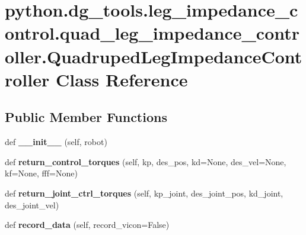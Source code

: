 \hypertarget{classpython_1_1dg__tools_1_1leg__impedance__control_1_1quad__leg__impedance__controller_1_1QuadrupedLegImpedanceController}{}\section{python.\+dg\+\_\+tools.\+leg\+\_\+impedance\+\_\+control.\+quad\+\_\+leg\+\_\+impedance\+\_\+controller.\+Quadruped\+Leg\+Impedance\+Controller Class Reference}
\label{classpython_1_1dg__tools_1_1leg__impedance__control_1_1quad__leg__impedance__controller_1_1QuadrupedLegImpedanceController}
\subsection*{Public Member Functions}
\begin{DoxyCompactItemize}
\item 
def {\bfseries \+\_\+\+\_\+init\+\_\+\+\_\+} (self, robot)\hypertarget{classpython_1_1dg__tools_1_1leg__impedance__control_1_1quad__leg__impedance__controller_1_1QuadrupedLegImpedanceController_afc8023b76557c43c7c78728e2c488a13}{}\label{classpython_1_1dg__tools_1_1leg__impedance__control_1_1quad__leg__impedance__controller_1_1QuadrupedLegImpedanceController_afc8023b76557c43c7c78728e2c488a13}

\item 
def {\bfseries return\+\_\+control\+\_\+torques} (self, kp, des\+\_\+pos, kd=None, des\+\_\+vel=None, kf=None, fff=None)\hypertarget{classpython_1_1dg__tools_1_1leg__impedance__control_1_1quad__leg__impedance__controller_1_1QuadrupedLegImpedanceController_ac088ea885c8fd492b7530ab324a6c13d}{}\label{classpython_1_1dg__tools_1_1leg__impedance__control_1_1quad__leg__impedance__controller_1_1QuadrupedLegImpedanceController_ac088ea885c8fd492b7530ab324a6c13d}

\item 
def {\bfseries return\+\_\+joint\+\_\+ctrl\+\_\+torques} (self, kp\+\_\+joint, des\+\_\+joint\+\_\+pos, kd\+\_\+joint, des\+\_\+joint\+\_\+vel)\hypertarget{classpython_1_1dg__tools_1_1leg__impedance__control_1_1quad__leg__impedance__controller_1_1QuadrupedLegImpedanceController_a3771f36bdc425fe25f9ea7be910be6cc}{}\label{classpython_1_1dg__tools_1_1leg__impedance__control_1_1quad__leg__impedance__controller_1_1QuadrupedLegImpedanceController_a3771f36bdc425fe25f9ea7be910be6cc}

\item 
def {\bfseries record\+\_\+data} (self, record\+\_\+vicon=False)\hypertarget{classpython_1_1dg__tools_1_1leg__impedance__control_1_1quad__leg__impedance__controller_1_1QuadrupedLegImpedanceController_a4255058eb1cde0133b86e4833ce76eb8}{}\label{classpython_1_1dg__tools_1_1leg__impedance__control_1_1quad__leg__impedance__controller_1_1QuadrupedLegImpedanceController_a4255058eb1cde0133b86e4833ce76eb8}

\end{DoxyCompactItemize}
